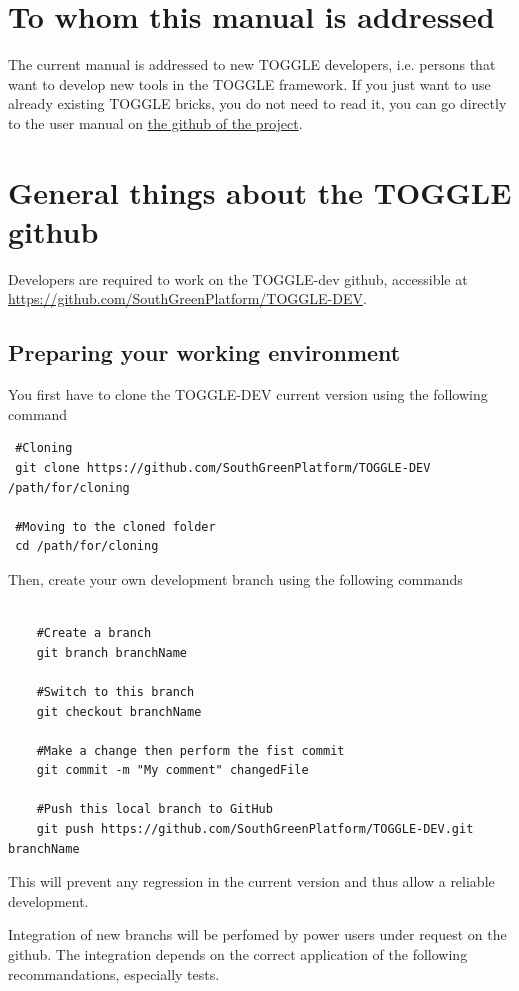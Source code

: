 \documentclass[a4paper,10pt]{report}
\begin{document}
\section{To whom this manual is addressed}
The current manual is addressed to new TOGGLE developers, i.e. persons that want to develop new tools in the TOGGLE framework.
If you just want to use already existing TOGGLE bricks, you do not need to read it, you can go directly to the user manual on \href{https://github.com/SouthGreenPlatform/TOGGLE}{the github of the project}.

\section{General things about the TOGGLE github}
Developers are required to work on the TOGGLE-dev github, accessible at \url{https://github.com/SouthGreenPlatform/TOGGLE-DEV}.

\subsection{Preparing your working environment}

You first have to clone the TOGGLE-DEV current version using the following command

\begin{verbatim}
 #Cloning
 git clone https://github.com/SouthGreenPlatform/TOGGLE-DEV /path/for/cloning
 
 #Moving to the cloned folder
 cd /path/for/cloning
\end{verbatim}

Then, create your own development branch using the following commands

\begin{verbatim}
 
    #Create a branch
    git branch branchName

    #Switch to this branch
    git checkout branchName

    #Make a change then perform the fist commit
    git commit -m "My comment" changedFile

    #Push this local branch to GitHub
    git push https://github.com/SouthGreenPlatform/TOGGLE-DEV.git branchName

\end{verbatim}

This will prevent any regression in the current version and thus allow a reliable development.

Integration of new branchs will be perfomed by power users under request on the github.
The integration depends on the correct application of the following recommandations, especially tests.
\end{document}
